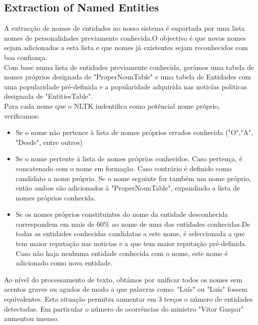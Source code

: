 \subsection{Extraction of Named Entities}
A extracção de nomes de entidades no nosso sistema é suportada por uma lista nomes de personalidades previamente conhecida.O objectivo é que novos nomes sejam adicionados a esta lista e que nomes já existentes sejam reconhecidos com boa confiança.\\
Com base numa lista de entidades previamente conhecida, gerámos uma tabela de nomes próprios designada de "ProperNounTable" e uma tabela de Entidades com uma popularidade pré-definida e a popularidade adquirida nas noticías politicas designada de "EntitiesTable".\\
Para cada nome que o NLTK indentifica como potêncial nome próprio, verificamos:
\begin{itemize}
\item Se o nome não pertence à lista de nomes próprios errados conhecida ("O","A", "Desde", entre outros)
\item Se o nome pertente à lista de nomes próprios conhecidos. Caso pertença, é concatenado com o nome em formação. Caso contrário é definido como candidato a nome próprio. Se o nome seguinte for também um nome próprio, então ambos são adicionados à "ProperNounTable", expandindo a lista de nomes próprios conhecida. 
\item Se os nomes próprios constituintes do nome da entidade desconhecida correspondem em mais de 60\% ao nome de uma das entidades conhecidas.De todas as entidades conhecidas candidatas a este nome, é seleccionada a que tem maior reputação nas noticias e a que tem maior reputação pré-definida. Caso não haja nenhuma entidade conhecida com o nome, este nome é adicionado como nova entidade.
\end{itemize}

Ao nível do processamento de texto, obtámos por unificar todos os nomes sem acentos graves ou agudos de modo a que palavras como: "Luís" ou "Luis" fossem equivalentes. Esta situação permitiu aumentar em 3 terços o número de entidades detectadas. Em particular o número de ocorrências do ministro "Vitor Gaspar" aumentou imenso. 